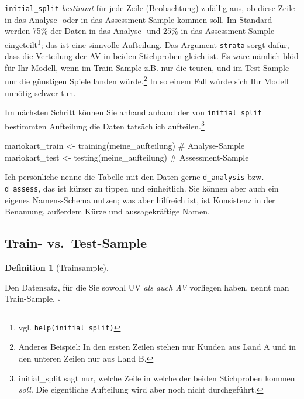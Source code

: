 \documentclass[
  letterpaper,
]{scrbook}
\newenvironment{Shaded}{\begin{snugshade}}{\end{snugshade}}
\newcommand{\CommentTok}[1]{\textcolor[rgb]{0.37,0.37,0.37}{#1}}
\newcommand{\FunctionTok}[1]{\textcolor[rgb]{0.28,0.35,0.67}{#1}}
\newcommand{\NormalTok}[1]{\textcolor[rgb]{0.00,0.23,0.31}{#1}}
\newcommand{\OtherTok}[1]{\textcolor[rgb]{0.00,0.23,0.31}{#1}}
\theoremstyle{definition}
\theoremstyle{definition}
\newtheorem{definition}{Definition}[chapter]
\theoremstyle{definition}
\theoremstyle{remark}
\begin{document}
\texttt{initial\_split} \emph{bestimmt} für jede Zeile (Beobachtung)
zufällig aus, ob diese Zeile in das Analyse- oder in das
Assessment-Sample kommen soll. Im Standard werden 75\% der Daten in das
Analyse- und 25\% in das Assessment-Sample eingeteilt\footnote{vgl.
  \texttt{help(initial\_split)}}; das ist eine sinnvolle Aufteilung. Das
Argument \texttt{strata} sorgt dafür, dass die Verteilung der AV in
beiden Stichproben gleich ist. Es wäre nämlich blöd für Ihr Modell, wenn
im Train-Sample z.B. nur die teuren, und im Test-Sample nur die
günstigen Spiele landen würde.\footnote{Anderes Beispiel: In den ersten
  Zeilen stehen nur Kunden aus Land A und in den unteren Zeilen nur aus
  Land B.} In so einem Fall würde sich Ihr Modell unnötig schwer tun.

Im nächsten Schritt können Sie anhand anhand der von
\texttt{initial\_split} bestimmten Aufteilung die Daten tatsächlich
aufteilen.\footnote{initial\_split sagt nur, welche Zeile in welche der
  beiden Stichproben kommen \emph{soll}. Die eigentliche Aufteilung wird
  aber noch nicht durchgeführt.}

\begin{Shaded}
\begin{Highlighting}[]
\NormalTok{mariokart\_train }\OtherTok{\textless{}{-}} 
  \FunctionTok{training}\NormalTok{(meine\_aufteilung)  }\CommentTok{\# Analyse{-}Sample}
\NormalTok{mariokart\_test }\OtherTok{\textless{}{-}} 
  \FunctionTok{testing}\NormalTok{(meine\_aufteilung)  }\CommentTok{\# Assessment{-}Sample}
\end{Highlighting}
\end{Shaded}

Ich persönliche nenne die Tabelle mit den Daten gerne
\texttt{d\_analysis} bzw. \texttt{d\_assess}, das ist kürzer zu tippen
und einheitlich. Sie können aber auch ein eigenes Namens-Schema nutzen;
was aber hilfreich ist, ist Konsistenz in der Benamung, außerdem Kürze
und aussagekräftige Namen.

\subsection{Train- vs.~Test-Sample}\label{train--vs.-test-sample}

\begin{definition}[Trainsample]\protect\hypertarget{def-trainsample}{}\label{def-trainsample}

Den Datensatz, für die Sie sowohl UV \emph{als auch AV} vorliegen haben,
nennt man Train-Sample. \(\square\)

\end{definition}
\end{document}
